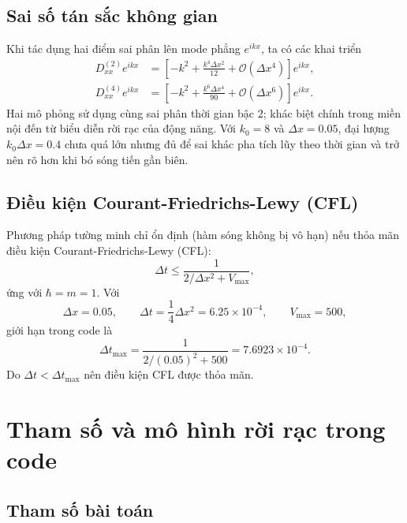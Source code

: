 \documentclass[12pt,a4paper]{article}
\begin{document}
\subsection{Sai số tán sắc không gian}

Khi tác dụng hai điểm sai phân lên mode phẳng $e^{ikx}$, ta có các khai triển
\begin{align}
    D_{xx}^{(2)}e^{ikx}
    &=\left[-k^2+\frac{k^4\Delta x^2}{12}
    +\mathcal O(\Delta x^4)\right]e^{ikx},\\
    D_{xx}^{(4)}e^{ikx}
    &=\left[-k^2+\frac{k^6\Delta x^4}{90}
    +\mathcal O(\Delta x^6)\right]e^{ikx}.
\end{align}
Hai mô phỏng sử dụng cùng sai phân thời gian bậc 2; khác biệt chính trong miền nội đến từ biểu diễn rời rạc của động năng. Với $k_0=8$ và $\Delta x=0.05$, đại lượng $k_0\Delta x=0.4$ chưa quá lớn nhưng đủ để sai khác pha tích lũy theo thời gian và trở nên rõ hơn khi bó sóng tiến gần biên.

\subsection{Điều kiện Courant-Friedrichs-Lewy (CFL)}

Phương pháp tường minh chỉ ổn định (hàm sóng không bị vô hạn) nếu thỏa mãn
điều kiện Courant-Friedrichs-Lewy (CFL):
\begin{equation}
    \Delta t\leq \frac{1}{2/\Delta x^2+V_{\max}},
    \label{eq:cflcode}
\end{equation}
ứng với $\hbar=m=1$. Với
\[
    \Delta x=0.05,\qquad
    \Delta t=\frac{1}{4}\Delta x^2=6.25\times10^{-4},\qquad
    V_{\max}=500,
\]
giới hạn trong code là
\begin{equation}
    \Delta t_{\max}=\frac{1}{2/(0.05)^2+500}
    =7.6923\times10^{-4}.
\end{equation}
Do $\Delta t<\Delta t_{\max}$ nên điều kiện CFL được thỏa mãn.

\section{Tham số và mô hình rời rạc trong code}

\subsection{Tham số bài toán}
\end{document}
